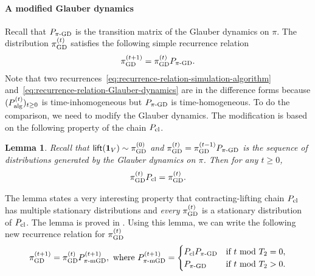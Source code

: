 \documentclass[11pt,a4paper]{article}
\newcommand{\psim}{P_{\textnormal{s-GD}}}
\newtheorem{lemma}[theorem]{Lemma}
\theoremstyle{definition}
\def\*#1{\mathbf{#1}} %
\begin{document}

\paragraph{A modified Glauber dynamics}
Recall that $P_{\pi\textnormal{-GD}}$ is the transition matrix of the Glauber dynamics on $\pi$. The distribution $\pi^{(t)}_{\textnormal{GD}}$ satisfies the following simple recurrence relation
\begin{align}\label{eq:recurrence-relation-Glauber-dynamics}
    \pi^{(t+1)}_{\textnormal{GD}} = \pi^{(t)}_{\textnormal{GD}} P_{\pi\textnormal{-GD}}.
\end{align}
Note that two recurrences~\eqref{eq:recurrence-relation-simulation-algorithm} and~\eqref{eq:recurrence-relation-Glauber-dynamics} are in the difference forms because $(P_{\textnormal{alg}}^{(t)})_{t \geq 0}$ is time-inhomogeneous but $P_{\pi\textnormal{-GD}}$ is time-homogeneous. To do the comparison, we need to modify the Glauber dynamics. The modification is based on the following property of the chain $P_{\textnormal{cl}}$.
\begin{lemma}\label{lem:many-stationary}
Recall that $\textsf{lift}(\*1_V) \sim \pi^{(0)}_{\textnormal{GD}}$ and $\pi^{(t)}_{\textnormal{GD}} = \pi^{(t-1)}_{\textnormal{GD}}P_{\pi\textnormal{-GD}}$ is the sequence of distributions generated by the Glauber dynamics on $\pi$. Then for any $t \geq 0$,
\begin{align*}
    \pi^{(t)}_{\textnormal{GD}} P_{\textnormal{cl}} = \pi^{(t)}_{\textnormal{GD}}.
\end{align*}
\end{lemma}
The lemma states a very interesting property that contracting-lifting chain $P_{\textnormal{cl}}$ has multiple stationary distributions and \emph{every} $\pi^{(t)}_{\textnormal{GD}}$ is a stationary distribution of $P_{\textnormal{cl}}$. 
The lemma is proved in .
Using this lemma, we can write the following new recurrence relation for $\pi^{(t)}_{\textnormal{GD}}$
\begin{align}\label{eq:recurrence-relation-Glauber-dynamics-modified}
   \pi^{(t+1)}_{\textnormal{GD}} = \pi^{(t)}_{\textnormal{GD}} P_{\pi\textnormal{-mGD}}^{(t+1)}, \text{ where } P_{\pi\textnormal{-mGD}}^{(t+1)} = \begin{cases}
        P_{\textnormal{cl}} P_{\pi\textnormal{-GD}} & \text{if } t \text{ mod } T_2 = 0, \\
        P_{\pi\textnormal{-GD}} & \text{if } t \text{ mod } T_2 > 0.
    \end{cases}
\end{align}
\end{document}
